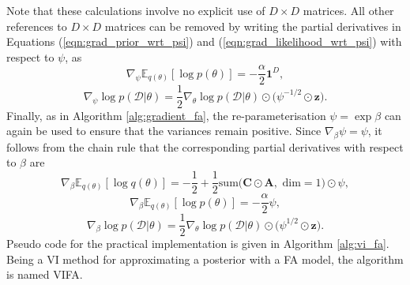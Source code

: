 \documentclass[msc,deptreport.inf]{infthesis} %
\newcommand{\matr}[1]{\mathbf{#1}}
\newcommand{\E}{\mathbb E}
\begin{document}
Note that these calculations involve no explicit use of $D \times D$ matrices. All other references to $D \times D$ matrices can be removed by writing the partial derivatives in Equations (\ref{eqn:grad_prior_wrt_psi}) and (\ref{eqn:grad_likelihood_wrt_psi}) with respect to $\psi$, as
\begin{equation}
	\nabla_\psi \E_{q(\theta)} [\log p(\theta)] = -\frac{\alpha}{2} \matr{1}^D,
\end{equation}
\begin{equation}
	\nabla_{\psi} \log p(\mathcal{D} | \theta) = \frac{1}{2} \nabla_\theta \log p(\mathcal{D} | \theta) \odot \big(\psi^{-1/2} \odot \matr{z} \big).
\end{equation}
Finally, as in Algorithm \ref{alg:gradient_fa}, the re-parameterisation $\psi = \exp \beta$ can again be used to ensure that the variances remain positive. Since $\nabla_\beta \psi = \psi$, it follows from the chain rule that the corresponding partial derivatives with respect to $\beta$ are 
\begin{equation}
	\nabla_\beta \E_{q(\theta)} [\log q(\theta)] = -\frac{1}{2} + \frac{1}{2} \text{sum}\big(\matr{C} \odot \matr{A}, \text{ dim} = 1\big) \odot \psi,
\end{equation}
\begin{equation}
	\nabla_\beta \E_{q(\theta)} [\log p(\theta)] = -\frac{\alpha}{2} \psi,
\end{equation}
\begin{equation}
	\nabla_{\beta} \log p(\mathcal{D} | \theta) = \frac{1}{2} \nabla_\theta \log p(\mathcal{D} | \theta) \odot \big(\psi^{1/2} \odot \matr{z}\big).
\end{equation}
Pseudo code for the practical implementation is given in Algorithm \ref{alg:vi_fa}. Being a VI method for approximating a posterior with a FA model, the algorithm is named VIFA.
\end{document}
